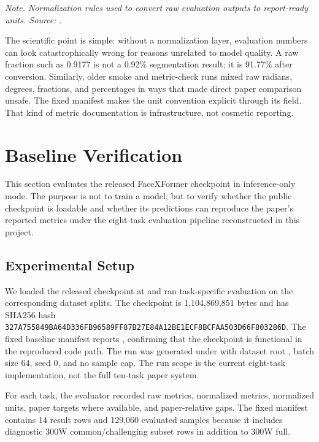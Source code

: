 \documentclass[11pt]{article}
\begin{document}
\emph{Note. Normalization rules used to convert raw evaluation outputs to report-ready units. Source: .}

The scientific point is simple: without a normalization layer, evaluation numbers can look catastrophically wrong for reasons unrelated to model quality. A raw fraction such as 0.9177 is not a 0.92\% segmentation result; it is 91.77\% after conversion. Similarly, older smoke and metric-check runs mixed raw radians, degrees, fractions, and percentages in ways that made direct paper comparison unsafe. The fixed manifest makes the unit convention explicit through its  field. That kind of metric documentation is infrastructure, not cosmetic reporting.


\section{Baseline Verification}


This section evaluates the released FaceXFormer checkpoint in inference-only mode. The purpose is not to train a model, but to verify whether the public checkpoint is loadable and whether its predictions can reproduce the paper's reported metrics under the eight-task evaluation pipeline reconstructed in this project.


\subsection{Experimental Setup}


We loaded the released checkpoint at  and ran task-specific evaluation on the corresponding dataset splits. The checkpoint is 1,104,869,851 bytes and has SHA256 hash \texttt{327A755849BA64D3\allowbreak{}36FB96589FF87B27\allowbreak{}E84A12BE1ECF8BCF\allowbreak{}AA503D66F803286D}. The fixed baseline manifest reports , confirming that the checkpoint is functional in the reproduced code path. The run was generated under  with dataset root , batch size 64, seed 0, and no sample cap. The run scope is the current eight-task implementation, not the full ten-task paper system.


For each task, the evaluator recorded raw metrics, normalized metrics, normalized units, paper targets where available, and paper-relative gaps. The fixed manifest contains 14 result rows and 129,060 evaluated samples because it includes diagnostic 300W common/challenging subset rows in addition to 300W full.
\end{document}
